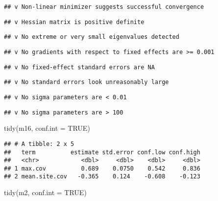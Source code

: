\documentclass[
]{article}
\newenvironment{Shaded}{\begin{snugshade}}{\end{snugshade}}
\newcommand{\AttributeTok}[1]{\textcolor[rgb]{0.77,0.63,0.00}{#1}}
\newcommand{\ConstantTok}[1]{\textcolor[rgb]{0.00,0.00,0.00}{#1}}
\newcommand{\FunctionTok}[1]{\textcolor[rgb]{0.00,0.00,0.00}{#1}}
\newcommand{\NormalTok}[1]{#1}
\begin{document}
\begin{verbatim}
## v Non-linear minimizer suggests successful convergence
\end{verbatim}

\begin{verbatim}
## v Hessian matrix is positive definite
\end{verbatim}

\begin{verbatim}
## v No extreme or very small eigenvalues detected
\end{verbatim}

\begin{verbatim}
## v No gradients with respect to fixed effects are >= 0.001
\end{verbatim}

\begin{verbatim}
## v No fixed-effect standard errors are NA
\end{verbatim}

\begin{verbatim}
## v No standard errors look unreasonably large
\end{verbatim}

\begin{verbatim}
## v No sigma parameters are < 0.01
\end{verbatim}

\begin{verbatim}
## v No sigma parameters are > 100
\end{verbatim}

\begin{Shaded}
\begin{Highlighting}[]
\FunctionTok{tidy}\NormalTok{(m16, }\AttributeTok{conf.int =} \ConstantTok{TRUE}\NormalTok{) }
\end{Highlighting}
\end{Shaded}

\begin{verbatim}
## # A tibble: 2 x 5
##   term          estimate std.error conf.low conf.high
##   <chr>            <dbl>     <dbl>    <dbl>     <dbl>
## 1 max.cov          0.689    0.0750    0.542     0.836
## 2 mean.site.cov   -0.365    0.124    -0.608    -0.123
\end{verbatim}

\begin{Shaded}
\begin{Highlighting}[]
\FunctionTok{tidy}\NormalTok{(m2, }\AttributeTok{conf.int =} \ConstantTok{TRUE}\NormalTok{) }
\end{Highlighting}
\end{Shaded}
\end{document}
